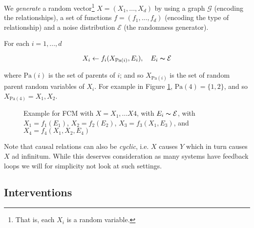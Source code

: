 We \textit{generate} a random vector\footnote{That is, each $X_i$ is a random variable.}
$X = (X_1, ..., X_d)$ by using a graph $\mathcal{G}$ (encoding the relationships),
a set of functions $f = (f_1, ..., f_d)$ (encoding the type of relationship) and a noise distribution $\mathcal{E}$
(the randomness generator).

For each $i = 1, ..., d$

$$
    X_i \leftarrow f_i(X_{\text{Pa}(i)}, E_i), \quad E_i \thicksim \mathcal{E}
$$

where $\text{Pa}(i)$ is the set of parents of $i$; and so $X_{\text{Pa}(i)}$ is the set of random parent
random variables of $X_i$. For example in Figure \ref{fig:fcm_1}, $\text{Pa}(4) = \{1, 2\}$, 
and so $X_{\text{Pa}(4)} = X_1, X_2$.

\begin{figure}[!h]
    \centering

    \caption{ Example for FCM with $X = X_1, ... X4$, with $E_i \thicksim \mathcal{E}$, 
    with $X_1 = f_1(E_1)$, $X_2 = f_2(E_2)$, $X_3 = f_3(X_1, E_3)$, and 
    $X_4 = f_4(X_1, X_2, E_4)$}
    \label{fig:fcm_1}

\end{figure}


Note that causal relations can also be \textit{cyclic}, i.e. $X$ causes $Y$ which in turn causes 
$X$ ad infinitum. While this deserves consideration as many systems have feedback loops we will
for simplicity not look at such settings.

\subsection{Interventions}

